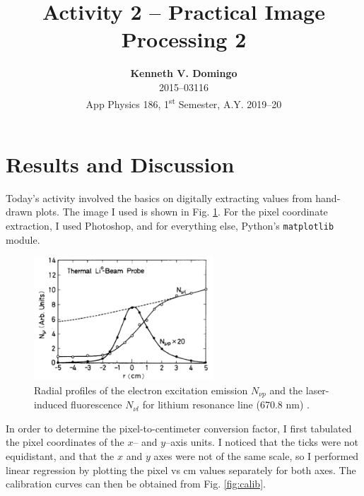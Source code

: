 \documentclass[12pt,a4paper]{article}
\begin{document}
\title{\TitleFont Activity 2 -- Practical Image Processing 2}
\author[ ]{\textbf{Kenneth V. Domingo} \\
2015--03116 \\
App Physics 186, 1\textsuperscript{st} Semester, A.Y. 2019--20}

\maketitle
\thispagestyle{titlestyle}

\section*{Results and Discussion}
Today's activity involved the basics on digitally extracting values from hand-drawn plots. The image I used is shown in Fig. \ref{fig:plot-used}. For the pixel coordinate extraction, I used Photoshop, and for everything else, Python's \texttt{matplotlib} module.

\begin{figure}[!htb]
	\centering
	\includegraphics[width=0.6\textwidth]{graph-image.png}
	\caption{Radial profiles of the electron excitation emission $N_{\nu p}$ and the laser-induced fluorescence $N_{\nu l}$ for lithium resonance line (670.8 nm) \cite{kadota}.}	
	\label{fig:plot-used}
\end{figure}

In order to determine the pixel-to-centimeter conversion factor, I first tabulated the pixel coordinates of the $x$-- and $y$--axis units. I noticed that the ticks were not equidistant, and that the $x$ and $y$ axes were not of the same scale, so I performed linear regression by plotting the pixel vs cm values separately for both axes. The calibration curves can then be obtained from Fig. \ref{fig:calib}.
\end{document}
